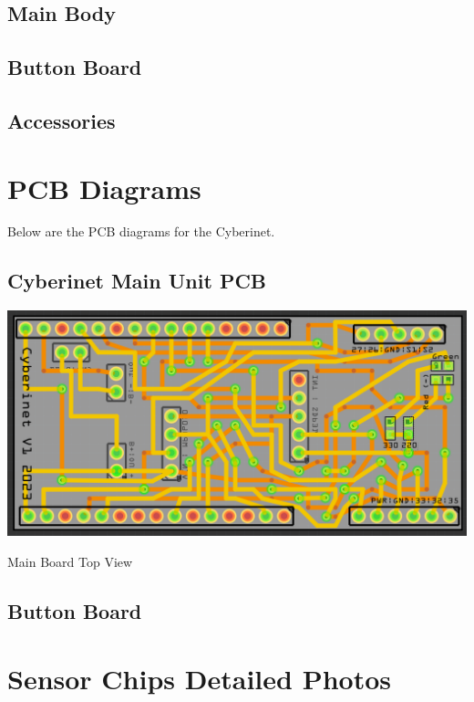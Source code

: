 \subsection{Main Body}
\vspace{5mm}


\subsection{Button Board}
\vspace{5mm}


\subsection{Accessories}
\vspace{5mm}


\section{PCB Diagrams}
Below are the PCB diagrams for the Cyberinet.

\subsection{Cyberinet Main Unit PCB}
\vspace{5mm}

\begin{center}
    \includegraphics[scale=0.5]{diagrams/PCBs/mainBoard.png}
    \caption{Main Board Top View}
\end{center}

\subsection{Button Board}
\vspace{5mm}

\section{Sensor Chips Detailed Photos}

